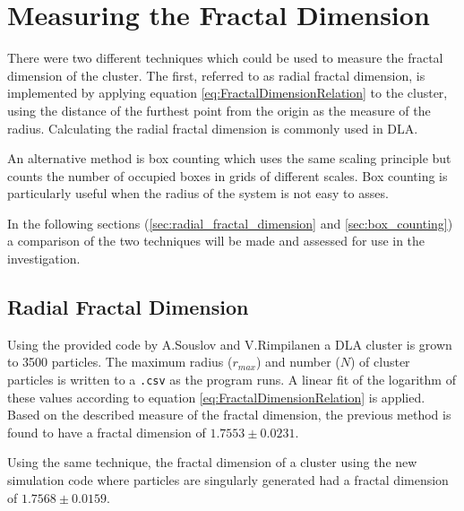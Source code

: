\documentclass[%
 aapm,
 mph,%
 amsmath,amssymb,
 reprint,%
]{revtex4-2}
\begin{document}
\section{\label{sec:fractal_dimension}Measuring the Fractal Dimension}
There were two different techniques which could be used to measure the fractal dimension of the cluster. The first, referred to as radial fractal dimension, is implemented by applying equation \ref{eq:FractalDimensionRelation} to the cluster, using the distance of the furthest point from the origin as the measure of the radius\cite{CompBCoursework,MeakinDLA,FractalsBook}. Calculating the radial fractal dimension is commonly used in DLA\cite{FractalsBook,MeakinDLA,WittenDLA}.

An alternative method is box counting\cite{CompACoursework} which uses the same scaling principle but counts the number of occupied boxes in grids of different scales. Box counting is particularly useful when the radius of the system is not easy to asses.

In the following sections (\ref{sec:radial_fractal_dimension} and \ref{sec:box_counting}) a comparison of the two techniques will be made and assessed for use in the investigation.
\subsection{\label{sec:radial_fractal_dimension}Radial Fractal Dimension}
Using the provided code by A.Souslov and V.Rimpilanen a DLA cluster is grown to 3500 particles. The maximum radius ($r_{max}$) and number ($N$) of cluster particles is written to a \verb+.csv+ as the program runs. A linear fit of the logarithm of these values according to equation \ref{eq:FractalDimensionRelation} is applied. Based on the described measure of the fractal dimension, the previous method is found to have a fractal dimension of $1.7553 \pm 0.0231$.

Using the same technique, the fractal dimension of a cluster using the new simulation code where particles are singularly generated had a fractal dimension of $1.7568 \pm 0.0159$.
\end{document}
